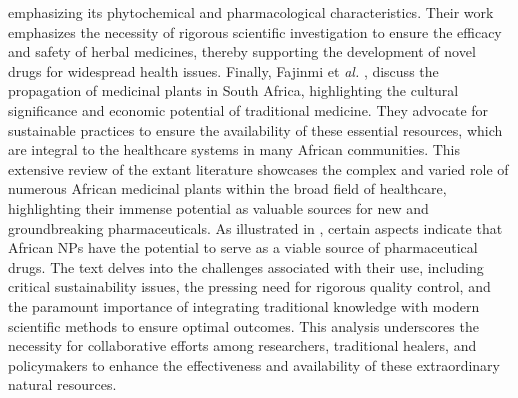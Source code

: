 emphasizing its phytochemical and pharmacological characteristics. Their work emphasizes the necessity of rigorous scientific investigation to ensure the efficacy and safety of herbal medicines, thereby supporting the development of novel drugs for widespread health issues. Finally, Fajinmi et \emph{al.} \cite{Fajinmi2023}, discuss the propagation of medicinal plants in South Africa, highlighting the cultural significance and economic potential of traditional medicine. They advocate for sustainable practices to ensure the availability of these essential resources, which are integral to the healthcare systems in many African communities.
This extensive review of the extant literature showcases the complex and varied role of numerous African medicinal plants within the broad field of healthcare, highlighting their immense potential as valuable sources for new and groundbreaking pharmaceuticals. As illustrated in , certain aspects indicate that African NPs have the potential to serve as a viable source of pharmaceutical drugs. The text delves into the challenges associated with their use, including critical sustainability issues, the pressing need for rigorous quality control, and the paramount importance of integrating traditional knowledge with modern scientific methods to ensure optimal outcomes. This analysis underscores the necessity for collaborative efforts among researchers, traditional healers, and policymakers to enhance the effectiveness and availability of these extraordinary natural resources.

